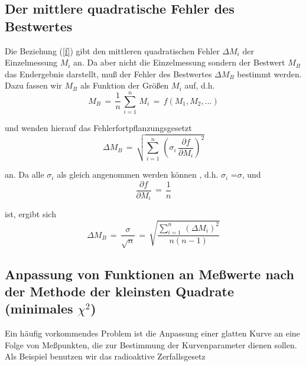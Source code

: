 \subsection{Der mittlere quadratische Fehler des Bestwertes}

Die Beziehung (\ref{f}) gibt den mittleren quadratischen Fehler $\Delta
M_{i}$ der Einzelmessung $M_{i}$ an. Da aber nicht die Einzelmessung
sondern der Bestwert $M_B$ das Endergebnis darstellt, muß {} der Fehler
des Bestwertes $\Delta M_{B}$ bestimmt werden. Dazu fassen wir $M_B$
als Funktion der Größen $M_{i}$ auf, d.h.\\

\begin{equation} \label{s}
M_{B}\,=\,\frac{1}{n}\,\sum_{i=1}^{n}\,M_{i}\,=\,f(M_{1}, M_{2},...)
\end{equation}

und wenden hierauf das Fehlerfortpflanzungsgesetzt\\

\begin{equation} \label{t}
\Delta M_{B}\,=\,\sqrt{\sum_{i=1}^{n}\,\left(\sigma_{i}\,\frac{\partial
 f}{\partial M_{i}}\right)^{2}}
\end{equation}

an. Da alle $\sigma_i$ als gleich angenommen werden können , d.h. $\sigma_i$ =$\sigma$, und\\

\begin{equation} \label{u}
\frac{\partial f}{\partial M_{i}}\,=\,\frac{1}{n}
\end{equation}

ist, ergibt sich\\

\begin{equation} \label{v}
\Delta
M_{B}\,=\,\frac{\sigma}{\sqrt{n}}\,=\,\sqrt{\frac{\sum_{i=1}^{n}\,(\Delta
 M_{i})^{2}}{n(n-1)}}
\end{equation}



\subsection{Anpassung von Funktionen an Meßwerte nach der Methode der
 kleinsten Quadrate (minimales $\chi^2$)}

Ein häufig vorkommendes Problem ist die Anpassung einer glatten Kurve
an eine Folge von Meßpunkten, die zur Bestimmung der Kurvenparameter
dienen sollen. Als Beispiel benutzen wir das radioaktive
Zerfallsgesetz\\


